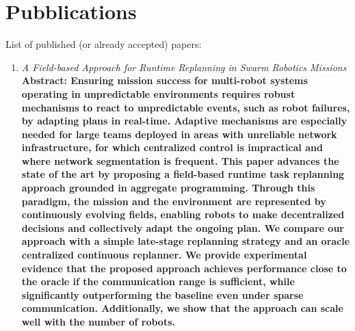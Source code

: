 \documentclass[runningheads]{llncs}
\begin{document}
    \section{Pubblications}
    List of published (or already accepted) papers:
    \begin{enumerate}
        \item \emph{A Field-based Approach for Runtime Replanning in Swarm Robotics Missions}
        \textbf{Abstract:
        Ensuring mission success for multi-robot systems operating
        in unpredictable environments requires robust mechanisms to react to unpredictable events,
            such as robot failures,
            by adapting plans in real-time.
%
            Adaptive mechanisms are especially needed for large teams deployed in areas with unreliable network infrastructure,
            for which centralized control is impractical and where network segmentation is frequent.
%
            This paper advances the state of the art by proposing a field-based runtime task replanning approach grounded in aggregate programming.
%
            Through this paradigm,
            the mission and the environment are represented by continuously evolving fields,
            enabling robots to make decentralized decisions
            and collectively adapt the ongoing plan.
%
            We compare our approach with a simple late-stage replanning strategy
            and an oracle centralized continuous replanner.
%
            We provide experimental evidence that
            the proposed approach achieves performance close to the oracle if the communication range is sufficient,
            while significantly outperforming the baseline even under sparse communication.
%
            Additionally, we show that the approach can scale well with the number of robots.
        }

    \end{enumerate}
\end{document}
